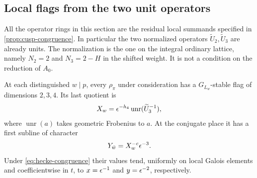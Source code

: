 \subsection{Local flags from the two unit operators}
\label{subsec:local-flags}

All the operator rings in this section are the residual local summands
specified in \cref{prop:cusp-congruence}.  In particular the two
normalized operators $\widetilde U_2,\widetilde U_3$ are already units.
The normalization is the one on the integral ordinary lattice, namely
$N_2=2$ and $N_3=2-H$ in the shifted weight.  It is not a condition on
the reduction of $A_0$.

\begin{lemma}
\label{lem:two-contacts}
At each distinguished $w\mid p$, every $\rho_\pi$ under consideration
has a $G_{L_w}$-stable flag of dimensions $2,3,4$.  Its last quotient is
\begin{equation}
 X_w=\epsilon^{-h_4}\operatorname{unr}(\widetilde U_3^{-1}),
 \label{eq:last-character}
\end{equation}
where $\operatorname{unr}(a)$ takes geometric Frobenius to $a$.
At the conjugate place it has a first subline of character
\begin{equation}
 Y_{\bar w}=X_w^{-c}\epsilon^{-3}.
 \label{eq:first-character}
\end{equation}
Under \cref{eq:hecke-congruence} their values tend, uniformly on local
Galois elements and coefficientwise in $t$, to
$x=\epsilon^{-1}$ and $y=\epsilon^{-2}$, respectively.
\end{lemma}

